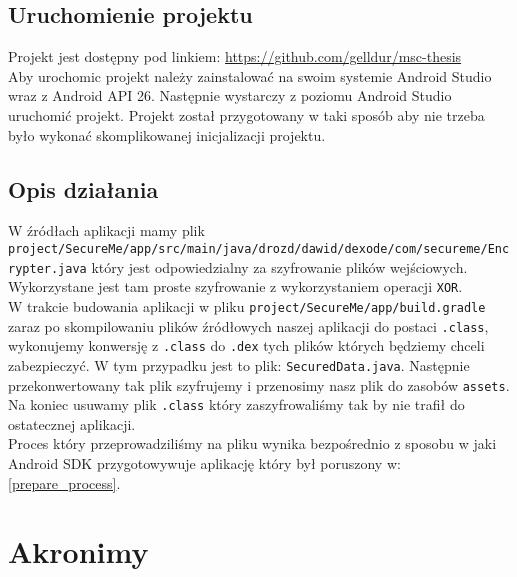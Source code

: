 \documentclass[12pt,a4paper,leqno,oneside,titlepage]{book}
\begin{document}
\section{Uruchomienie projektu}
%
Projekt jest dostępny pod linkiem: \url{https://github.com/gelldur/msc-thesis}\\
Aby urochomic projekt należy zainstalować na swoim systemie Android Studio\cite{AndroidStudio} wraz z Android API 26. Następnie wystarczy z poziomu Android Studio uruchomić projekt. Projekt został przygotowany w taki sposób aby nie trzeba było wykonać skomplikowanej inicjalizacji projektu.
%
%
%
%
\section{Opis działania}
%
W źródłach aplikacji mamy plik \verb|project/SecureMe/app/src/main/java/drozd/dawid/dexode/com/secureme/Encrypter.java| który jest odpowiedzialny za szyfrowanie plików wejściowych. Wykorzystane jest tam proste szyfrowanie z wykorzystaniem operacji \verb|XOR|.\\
W trakcie budowania aplikacji w pliku \verb|project/SecureMe/app/build.gradle| zaraz po skompilowaniu plików źródłowych naszej aplikacji do postaci \verb|.class|, wykonujemy konwersję z \verb|.class| do \verb|.dex| tych plików których będziemy chceli zabezpieczyć. W tym przypadku jest to plik: \verb|SecuredData.java|. Następnie przekonwertowany tak plik szyfrujemy i przenosimy nasz plik do zasobów \verb|assets|. Na koniec usuwamy plik \verb|.class| który zaszyfrowaliśmy tak by nie trafił do ostatecznej aplikacji.\\
Proces który przeprowadziliśmy na pliku wynika bezpośrednio z sposobu w jaki Android SDK przygotowywuje aplikację który był poruszony w: \ref{prepare_process}.\\
%
%
%
\newpage
\nocite{*}

{}

\chapter*{Akronimy}
\begin{acronym}
\end{acronym}
\end{document}
